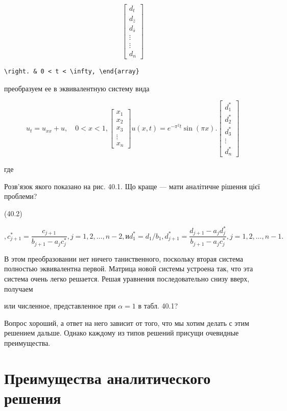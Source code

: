 \documentclass[
  ukrainian,
]{article}
\begin{document}
\[
\begin{bmatrix} d_t \\ d_{\bar{z}} \\ d_{\bar{s}} \\ \vdots \\ \vdots \\ d_n \end{bmatrix}
\]

\begin{verbatim}
\right. & 0 < t < \infty, \end{array}
\end{verbatim}

преобразуем ее в эквивалентную систему вида

\[
u_t = u_{xx} + u, \quad 0 < x < 1,
\begin{bmatrix} x_1 \\ x_2 \\ x_3 \\ \vdots \\ x_n \end{bmatrix}
u(x, t) = e^{-\pi^2 t} \sin(\pi x).
\begin{bmatrix} d_1^* \\ d_2^* \\ d_3^* \\ \vdots \\ d_n^* \end{bmatrix}
\]

где

Розв'язок якого показано на рис. 40.1. Що краще --- мати аналітичне
рішення цієї проблеми?

(40.2)

\[
,  c_{j+1}^* = \frac{c_{j+1}}{b_{j+1} - a_j c_j^*}  ,  j = 1, 2, \ldots, n-2  , и  d_1^* = d_1/b_1  ,  d_{j+1}^* = \frac{d_{j+1} - a_j d_j^*}{b_{j+1} - a_j c_j^*}  ,  j = 1, 2, \ldots, n-1  .
\]

В этом преобразовании нет ничего таниственного, поскольку вторая система
полностью эквивалентна первой. Матрица новой системы устроена так, что
эта система очень легко решается. Решая уравнения последовательно снизу
вверх, получаем

или численное, представленное при \(\alpha = 1\) в табл. 40.1?

Вопрос хороший, а ответ на него зависит от того, что мы хотим делать с
этим решением дальше. Однако каждому из типов решений присущи очевидные
преимущества.

\section{Преимущества аналитического
решения}\label{ux43fux440ux435ux438ux43cux443ux449ux435ux441ux442ux432ux430-ux430ux43dux430ux43bux438ux442ux438ux447ux435ux441ux43aux43eux433ux43e-ux440ux435ux448ux435ux43dux438ux44f}
\end{document}
